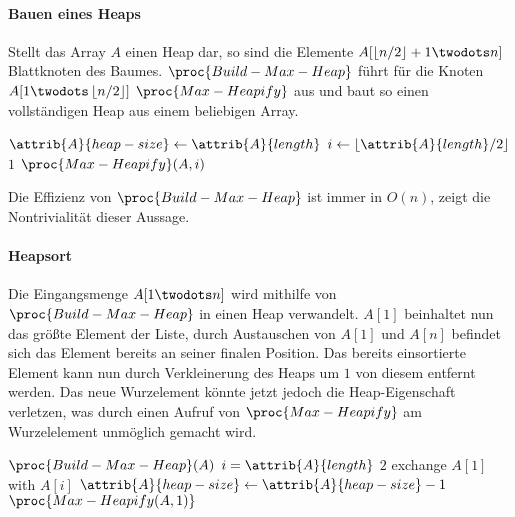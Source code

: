 \paragraph{Bauen eines Heaps}

Stellt das Array $A$ einen Heap dar, so sind die Elemente $A[\floor{n / 2} + 1 \twodots n]$ Blattknoten des Baumes\footnotemark. $\proc{Build-Max-Heap}$ führt für die Knoten $A[1 \twodots \floor{n / 2}]$ $\proc{Max-Heapify}$ aus und baut so einen vollständigen Heap aus einem beliebigen Array.


\begin{codebox}
    \li $\attrib{A}{heap-size} \gets \attrib{A}{length}$
    \li \For $i \gets \lfloor \attrib{A}{length}/2 \rfloor$ \Downto $1$
    \li     \Do
                $\proc{Max-Heapify}(A, i)$
            \End
\end{codebox}

Die Effizienz von $\proc{Build-Max-Heap}$ ist immer in $O(n)$, \cite[155]{taocp3} zeigt die Nontrivialität dieser Aussage.

\paragraph{Heapsort}

Die Eingangsmenge $A[1 \twodots n]$ wird mithilfe von $\proc{Build-Max-Heap}$ in einen Heap verwandelt. $A[1]$ beinhaltet nun das größte Element der Liste, durch Austauschen von $A[1]$ und $A[n]$ befindet sich das Element bereits an seiner finalen Position. Das bereits einsortierte Element kann nun durch Verkleinerung des Heaps um $1$ von diesem entfernt werden. Das neue Wurzelement könnte jetzt jedoch die Heap-Eigenschaft verletzen, was durch einen Aufruf von $\proc{Max-Heapify}$ am Wurzelelement unmöglich gemacht wird.

\begin{codebox}
    \li $\proc{Build-Max-Heap}(A)$
    \li \For $i = \attrib{A}{length}$ \Downto $2$
    \li     \Do
                exchange $A[1]$ with $A[i]$
    \li         $\attrib{A}{heap-size} \gets \attrib{A}{heap-size} - 1$
    \li         $\proc{Max-Heapify(A, 1)}$
            \End
\end{codebox}

